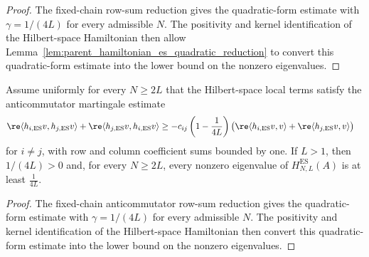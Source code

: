 \begin{proof}
    \leanok
    The fixed-chain row-sum reduction gives the quadratic-form estimate with
    $\gamma=1/(4L)$ for every admissible $N$. The positivity and kernel
    identification of the Hilbert-space Hamiltonian then allow
    Lemma~\ref{lem:parent_hamiltonian_es_quadratic_reduction} to convert this
    quadratic-form estimate into the lower bound on the nonzero eigenvalues.
\end{proof}

\begin{lemma}
    \label{lem:parent_hamiltonian_anticommutator_rowsum_gap}
    \leanok
    Assume uniformly for every $N\ge2L$ that the Hilbert-space local terms satisfy
    the anticommutator martingale estimate
    \begin{align}
        \re\langle h_{i,\mathrm{ES}}v,h_{j,\mathrm{ES}}v\rangle
        +\re\langle h_{j,\mathrm{ES}}v,h_{i,\mathrm{ES}}v\rangle
         & \ge
        -c_{ij}\left(1-\frac{1}{4L}\right)
        \bigl(    \re\langle h_{i,\mathrm{ES}}v,v\rangle
        +\re\langle h_{j,\mathrm{ES}}v,v\rangle
        \bigr)
        \notag
    \end{align}
    for $i\ne j$, with row and column coefficient sums bounded by one. If
    $L>1$, then $1/(4L)>0$ and, for every $N\ge2L$, every nonzero eigenvalue of
    $H_{N,L}^{\mathrm{ES}}(A)$ is at least $\frac{1}{4L}$.
\end{lemma}

\begin{proof}
    \leanok
    The fixed-chain anticommutator row-sum reduction gives the quadratic-form
    estimate with $\gamma=1/(4L)$ for every admissible $N$. The positivity and
    kernel identification of the Hilbert-space Hamiltonian then convert this
    quadratic-form estimate into the lower bound on the nonzero eigenvalues.
\end{proof}

